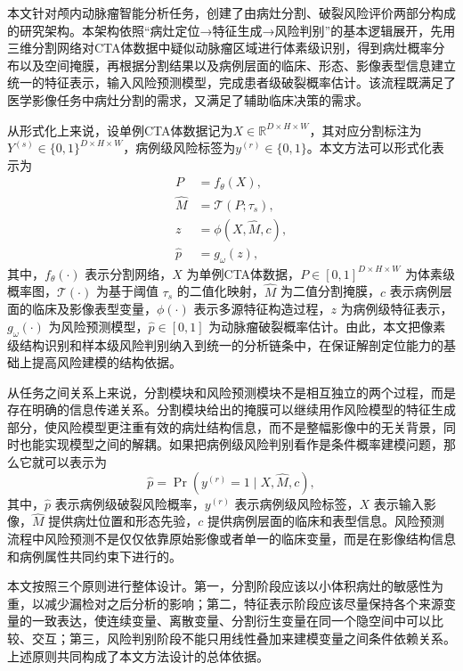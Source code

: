 
本文针对颅内动脉瘤智能分析任务，创建了由病灶分割、破裂风险评价两部分构成的研究架构。本架构依照“病灶定位→特征生成→风险判别”的基本逻辑展开，先用三维分割网络对CTA体数据中疑似动脉瘤区域进行体素级识别，得到病灶概率分布以及空间掩膜，再根据分割结果以及病例层面的临床、形态、影像表型信息建立统一的特征表示，输入风险预测模型，完成患者级破裂概率估计。该流程既满足了医学影像任务中病灶分割的需求，又满足了辅助临床决策的需求。

从形式化上来说，设单例CTA体数据记为$X\in\mathbb{R}^{D\times H\times W}$，其对应分割标注为$Y^{(s)}\in\{0,1\}^{D\times H\times W}$，病例级风险标签为$y^{(r)}\in\{0,1\}$。本文方法可以形式化表示为
\begin{align}
P &= f_{\theta}(X),\\
\hat{M} &= \mathcal{T}(P;\tau_s),\\
z &= \phi(X,\hat{M},c),\\
\hat{p} &= g_{\omega}(z),
\label{eq:method-pipeline}
\end{align}
其中，$f_{\theta}(\cdot)$ 表示分割网络，$X$ 为单例CTA体数据，$P\in[0,1]^{D\times H\times W}$ 为体素级概率图，$\mathcal{T}(\cdot)$ 为基于阈值 $\tau_s$ 的二值化映射，$\hat{M}$ 为二值分割掩膜，$c$ 表示病例层面的临床及影像表型变量，$\phi(\cdot)$ 表示多源特征构造过程，$z$ 为病例级特征表示，$g_{\omega}(\cdot)$ 为风险预测模型，$\hat{p}\in[0,1]$ 为动脉瘤破裂概率估计。由此，本文把像素级结构识别和样本级风险判别纳入到统一的分析链条中，在保证解剖定位能力的基础上提高风险建模的结构依据。

从任务之间关系上来说，分割模块和风险预测模块不是相互独立的两个过程，而是存在明确的信息传递关系。分割模块给出的掩膜可以继续用作风险模型的特征生成部分，使风险模型更注重有效的病灶结构信息，而不是整幅影像中的无关背景，同时也能实现模型之间的解耦。如果把病例级风险判别看作是条件概率建模问题，那么它就可以表示为
\begin{equation}
\hat{p}=\Pr\left(y^{(r)}=1\mid X,\hat{M},c\right),
\label{eq:risk-posterior}
\end{equation}
其中，$\hat{p}$ 表示病例级破裂风险概率，$y^{(r)}$ 表示病例级风险标签，$X$ 表示输入影像，$\hat{M}$ 提供病灶位置和形态先验，$c$ 提供病例层面的临床和表型信息。风险预测流程中风险预测不是仅仅依靠原始影像或者单一的临床变量，而是在影像结构信息和病例属性共同约束下进行的。

本文按照三个原则进行整体设计。第一，分割阶段应该以小体积病灶的敏感性为重，以减少漏检对之后分析的影响；第二，特征表示阶段应该尽量保持各个来源变量的一致表达，使连续变量、离散变量、分割衍生变量在同一个隐空间中可以比较、交互；第三，风险判别阶段不能只用线性叠加来建模变量之间条件依赖关系。上述原则共同构成了本文方法设计的总体依据。

